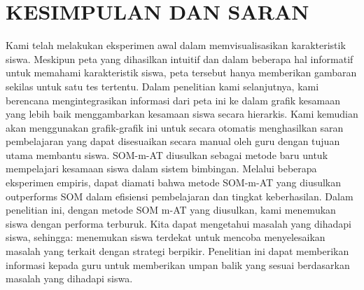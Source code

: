 \chapter{KESIMPULAN DAN SARAN}

Kami telah melakukan eksperimen awal dalam memvisualisasikan karakteristik siswa. Meskipun peta yang dihasilkan intuitif dan dalam beberapa hal informatif untuk memahami karakteristik siswa, peta tersebut hanya memberikan gambaran sekilas untuk satu tes tertentu. Dalam penelitian kami selanjutnya, kami berencana mengintegrasikan informasi dari peta ini ke dalam grafik kesamaan yang lebih baik menggambarkan kesamaan siswa secara hierarkis. Kami kemudian akan menggunakan grafik-grafik ini untuk secara otomatis menghasilkan saran pembelajaran yang dapat disesuaikan secara manual oleh guru dengan tujuan utama membantu siswa.
SOM-m-AT diusulkan sebagai metode baru untuk mempelajari kesamaan siswa dalam sistem bimbingan. Melalui beberapa eksperimen empiris, dapat diamati bahwa metode SOM-m-AT yang diusulkan outperforms SOM dalam efisiensi pembelajaran dan tingkat keberhasilan. Dalam penelitian ini, dengan metode SOM m-AT yang diusulkan, kami menemukan siswa dengan performa terburuk. Kita dapat mengetahui masalah yang dihadapi siswa, sehingga: menemukan siswa terdekat untuk mencoba menyelesaikan masalah yang terkait dengan strategi berpikir. Penelitian ini dapat memberikan informasi kepada guru untuk memberikan umpan balik yang sesuai berdasarkan masalah yang dihadapi siswa.



